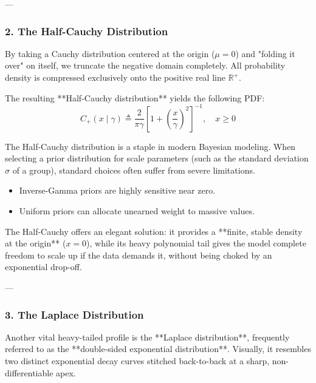 \documentclass{article}
\begin{document}
---

\subsubsection*{2. The Half-Cauchy Distribution}

By taking a Cauchy distribution centered at the origin ($\mu = 0$) and "folding it over" on itself, we truncate the negative domain completely. All probability density is compressed exclusively onto the positive real line $\mathbb{R}^+$.

The resulting **Half-Cauchy distribution** yields the following PDF:
\begin{equation}
C_+(x \mid \gamma) \triangleq \frac{2}{\pi \gamma} \left[ 1 + \left( \frac{x}{\gamma} \right)^2 \right]^{-1}, \quad x \ge 0 \tag{195}
\end{equation}

\begin{tcolorbox}[colback=yellow!5!white, colframe=yellow!60!black, title=Application in Bayesian Hierarchical Modeling]
The Half-Cauchy distribution is a staple in modern Bayesian modeling. When selecting a prior distribution for scale parameters (such as the standard deviation $\sigma$ of a group), standard choices often suffer from severe limitations. 
\begin{itemize}
    \item Inverse-Gamma priors are highly sensitive near zero.
    \item Uniform priors can allocate unearned weight to massive values.
\end{itemize}
The Half-Cauchy offers an elegant solution: it provides a **finite, stable density at the origin** ($x=0$), while its heavy polynomial tail gives the model complete freedom to scale up if the data demands it, without being choked by an exponential drop-off.
\end{tcolorbox}

---

\subsubsection*{3. The Laplace Distribution}

Another vital heavy-tailed profile is the **Laplace distribution**, frequently referred to as the **double-sided exponential distribution**. Visually, it resembles two distinct exponential decay curves stitched back-to-back at a sharp, non-differentiable apex.
\end{document}
